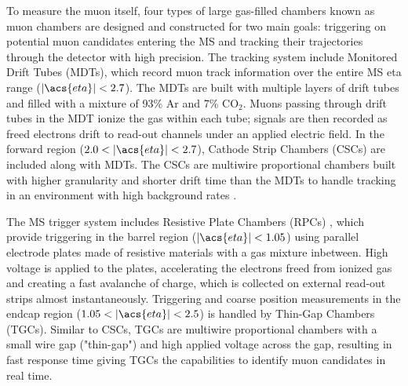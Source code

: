 \documentclass[../thesis.tex]{subfiles}
\begin{document}
To measure the muon itself, four types of large gas-filled chambers known as muon chambers \citep{atlas} are designed and constructed for two main goals: triggering on potential muon candidates entering the \acs{MS} and tracking their trajectories through the detector with high precision. The tracking system include Monitored Drift Tubes (\acs{MDT}s), which record muon track information over the entire \acs{MS} \acs{eta} range ($|\acs{eta}|<2.7$). The \acs{MDT}s are built with multiple layers of drift tubes and filled with a mixture of 93\% Ar and 7\% $\text{CO}_2$.  Muons passing through drift tubes in the \acs{MDT} ionize the gas within each tube; signals are then recorded as freed electrons drift to read-out channels under an applied electric field. In the forward region ($2.0<|\acs{eta}|<2.7$), Cathode Strip Chambers (\acs{CSC}s) are included along with \acs{MDT}s. The \acs{CSC}s are multiwire proportional chambers built with higher granularity and shorter drift time than the \acs{MDT}s to handle tracking in an environment with high background rates .

The \acs{MS} trigger system includes Resistive Plate Chambers (\acs{RPC}s) \citep{atlas}, which provide triggering in the barrel region ($|\acs{eta}|<1.05$) using parallel electrode plates made of resistive materials with a gas mixture inbetween. High voltage is applied to the plates, accelerating the electrons freed from ionized gas and creating a fast avalanche of charge, which is collected on external read-out strips almost instantaneously. Triggering and coarse position measurements in the endcap region ($1.05<|\acs{eta}|<2.5$) is handled by Thin-Gap Chambers (\acs{TGC}s). Similar to \acs{CSC}s, \acs{TGC}s are multiwire proportional chambers with a small wire gap ("thin-gap") and high applied voltage across the gap, resulting in fast response time giving \acs{TGC}s the capabilities to identify muon candidates in real time.
	
\end{document}
